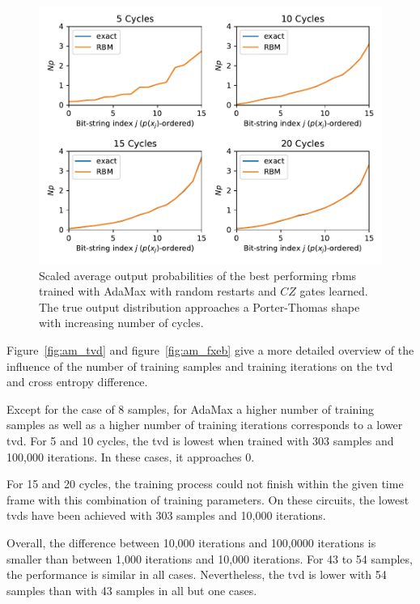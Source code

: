 \begin{figure}[H]
  \centering
  \includegraphics[width=\textwidth]{figures/results/AM-restarts-learned/avgBestPDF.pdf}
  \caption[Scaled Average Output Probabilities of Best Performing RBMs Trained with AdaMax with Random Restarts and $CZ$ Gates Learned]{
    Scaled average output probabilities of the best performing \gls{rbm}s trained with AdaMax with random restarts and $CZ$ gates learned. The true 
    output distribution approaches a Porter-Thomas shape with increasing number of cycles.}
  \label{fig:am_avgBestPDF}
\end{figure}

Figure~\ref{fig:am_tvd} and figure~\ref{fig:am_fxeb} give a more detailed overview of the influence of the 
number of training samples and training iterations on the \gls{tvd} and cross entropy difference.

Except for the case of 8 samples, for AdaMax a higher number of training samples as well as a higher 
number of training iterations corresponds to a lower \gls{tvd}. For 5 and 10 cycles, the \gls{tvd} is lowest
when trained with 303 samples and 100,000 iterations. In these cases, it approaches 0.

For 15 and 20 cycles, the training process could not finish
within the given time frame with this combination of training parameters. On these circuits, the lowest \gls{tvd}s have been achieved with 303 samples 
and 10,000 iterations.

Overall, the difference between 10,000 iterations and 100,0000 iterations is smaller than between 
1,000 iterations and 10,000 iterations. For 43 to 54 samples, the performance is similar in all cases.
Nevertheless, the \gls{tvd} is lower with 54 samples than with 43 samples in all but one cases.

